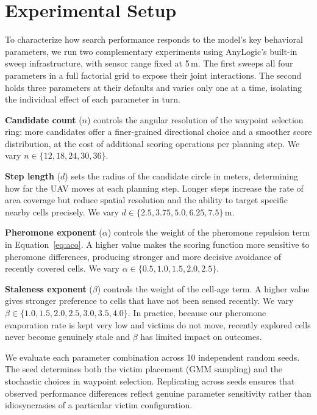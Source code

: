 \section{Experimental Setup}

To characterize how search performance responds to the model's key behavioral parameters, we run two complementary experiments using AnyLogic's built-in sweep infrastructure, with sensor range fixed at 5\,m. The first sweeps all four parameters in a full factorial grid to expose their joint interactions. The second holds three parameters at their defaults and varies only one at a time, isolating the individual effect of each parameter in turn.

\textbf{Candidate count} ($n$) controls the angular resolution of the waypoint selection ring: more candidates offer a finer-grained directional choice and a smoother score distribution, at the cost of additional scoring operations per planning step. We vary $n \in \{12, 18, 24, 30, 36\}$.

\textbf{Step length} ($d$) sets the radius of the candidate circle in meters, determining how far the UAV moves at each planning step. Longer steps increase the rate of area coverage but reduce spatial resolution and the ability to target specific nearby cells precisely. We vary $d \in \{2.5, 3.75, 5.0, 6.25, 7.5\}$\,m.

\textbf{Pheromone exponent} ($\alpha$) controls the weight of the pheromone repulsion term in Equation~\eqref{eq:aco}. A higher value makes the scoring function more sensitive to pheromone differences, producing stronger and more decisive avoidance of recently covered cells. We vary $\alpha \in \{0.5, 1.0, 1.5, 2.0, 2.5\}$.

\textbf{Staleness exponent} ($\beta$) controls the weight of the cell-age term. A higher value gives stronger preference to cells that have not been sensed recently. We vary $\beta \in \{1.0, 1.5, 2.0, 2.5, 3.0, 3.5, 4.0\}$. In practice, because our pheromone evaporation rate is kept very low and victims do not move, recently explored cells never become genuinely stale and $\beta$ has limited impact on outcomes.

We evaluate each parameter combination across 10 independent random seeds. The seed determines both the victim placement (GMM sampling) and the stochastic choices in waypoint selection. Replicating across seeds ensures that observed performance differences reflect genuine parameter sensitivity rather than idiosyncrasies of a particular victim configuration.


